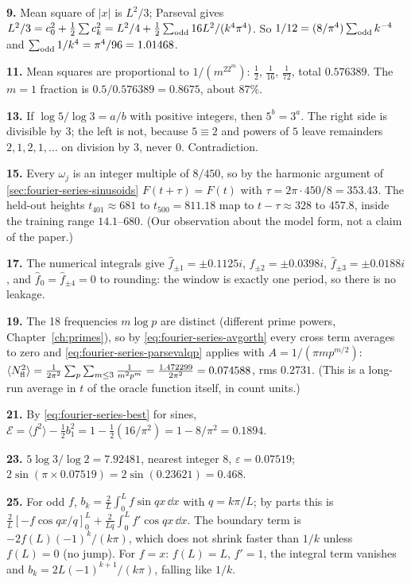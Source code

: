 \textbf{9.} Mean square of $|x|$ is $L^2/3$; Parseval gives $L^2/3=c_0^2+\tfrac12\sum c_k^2=L^2/4+\tfrac12\sum_{\rm odd}16L^2/(k^4\pi^4)$. So $1/12=(8/\pi^4)\sum_{\rm odd}k^{-4}$ and $\sum_{\rm odd}1/k^4=\pi^4/96=1.01468$.

\textbf{11.} Mean squares are proportional to $1/(m^22^m)$: $\tfrac12$, $\tfrac1{16}$, $\tfrac1{72}$, total $0.576389$. The $m=1$ fraction is $0.5/0.576389=0.8675$, about $87\%$.

\textbf{13.} If $\log5/\log3=a/b$ with positive integers, then $5^b=3^a$. The right side is divisible by $3$; the left is not, because $5\equiv2$ and powers of $5$ leave remainders $2,1,2,1,\dots$ on division by $3$, never $0$. Contradiction.

\textbf{15.} Every $\omega_j$ is an integer multiple of $8/450$, so by the harmonic argument of \cref{sec:fourier-series-sinusoids} $F(t+\tau)=F(t)$ with $\tau=2\pi\cdot450/8=353.43$. The held-out heights $t_{401}\approx681$ to $t_{500}=811.18$ map to $t-\tau\approx328$ to $457.8$, inside the training range $14.1$--$680$. (Our observation about the model form, not a claim of the paper.)

\textbf{17.} The numerical integrals give $\hat f_{\pm1}=\pm0.1125i$, $\hat f_{\pm2}=\pm0.0398i$, $\hat f_{\pm3}=\pm0.0188i$, and $\hat f_0=\hat f_{\pm4}=0$ to rounding: the window is exactly one period, so there is no leakage.

\textbf{19.} The 18 frequencies $m\log p$ are distinct (different prime powers, Chapter~\ref{ch:primes}), so by \cref{eq:fourier-series-avgorth} every cross term averages to zero and \cref{eq:fourier-series-parsevalqp} applies with $A=1/(\pi mp^{m/2})$: $\langle N_{\mathrm{fl}}^2\rangle=\frac1{2\pi^2}\sum_p\sum_{m\le3}\frac1{m^2p^m}=\frac{1.472299}{2\pi^2}=0.074588$, rms $0.2731$. (This is a long-run average in $t$ of the oracle function itself, in count units.)

\textbf{21.} By \cref{eq:fourier-series-best} for sines, $\mathcal{E}=\langle f^2\rangle-\tfrac12b_1^2=1-\tfrac12(16/\pi^2)=1-8/\pi^2=0.1894$.

\textbf{23.} $5\log3/\log2=7.92481$, nearest integer $8$, $\varepsilon=0.07519$; $2\sin(\pi\times0.07519)=2\sin(0.23621)=0.468$.

\textbf{25.} For odd $f$, $b_k=\frac2L\int_0^Lf\sin qx\,\dd x$ with $q=k\pi/L$; by parts this is $\frac2L[-f\cos qx/q]_0^L+\frac{2}{Lq}\int_0^Lf'\cos qx\,\dd x$. The boundary term is $-2f(L)(-1)^k/(k\pi)$, which does not shrink faster than $1/k$ unless $f(L)=0$ (no jump). For $f=x$: $f(L)=L$, $f'=1$, the integral term vanishes and $b_k=2L(-1)^{k+1}/(k\pi)$, falling like $1/k$.

